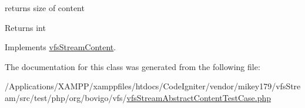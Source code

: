 returns size of content

\begin{DoxyReturn}{Returns}
int 
\end{DoxyReturn}


Implements \mbox{\hyperlink{interfaceorg_1_1bovigo_1_1vfs_1_1vfs_stream_content_a775bfb88c1bb7975d67f277eade2a1b7}{vfs\+Stream\+Content}}.



The documentation for this class was generated from the following file\+:\begin{DoxyCompactItemize}
\item 
/\+Applications/\+X\+A\+M\+P\+P/xamppfiles/htdocs/\+Code\+Igniter/vendor/mikey179/vfs\+Stream/src/test/php/org/bovigo/vfs/\mbox{\hyperlink{vfs_stream_abstract_content_test_case_8php}{vfs\+Stream\+Abstract\+Content\+Test\+Case.\+php}}\end{DoxyCompactItemize}
